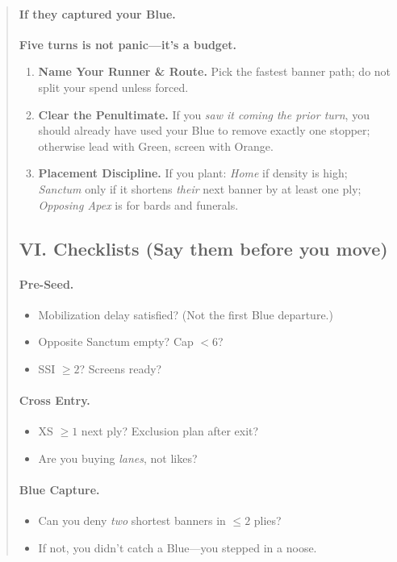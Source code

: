 \documentclass[11pt]{article}
\begin{document}
\begin{quote}
\paragraph{If they captured your Blue.} \textbf{Five turns is not panic—it's a budget.}
\begin{enumerate}\itemsep0.25em
  \item \textbf{Name Your Runner \& Route.} Pick the fastest banner path; do not split your spend unless forced.
  \item \textbf{Clear the Penultimate.} If you \emph{saw it coming the prior turn}, you should already have used your Blue to remove exactly one stopper; otherwise lead with Green, screen with Orange.
  \item \textbf{Placement Discipline.} If you plant: \emph{Home} if density is high; \emph{Sanctum} only if it shortens \emph{their} next banner by at least one ply; \emph{Opposing Apex} is for bards and funerals.
\end{enumerate}

\subsection{VI. Checklists (Say them before you move)}
\paragraph{Pre-Seed.}
\begin{itemize}\itemsep0.15em
  \item Mobilization delay satisfied? (Not the first Blue departure.)
  \item Opposite Sanctum empty? Cap $<6$?
  \item SSI $\ge 2$? Screens ready?
\end{itemize}
\paragraph{Cross Entry.}
\begin{itemize}\itemsep0.15em
  \item XS $\ge 1$ next ply? Exclusion plan after exit?
  \item Are you buying \emph{lanes}, not likes?
\end{itemize}
\paragraph{Blue Capture.}
\begin{itemize}\itemsep0.15em
  \item Can you deny \emph{two} shortest banners in $\le 2$ plies?
  \item If not, you didn’t catch a Blue—you stepped in a noose.
\end{itemize}


\end{quote}
\end{document}
